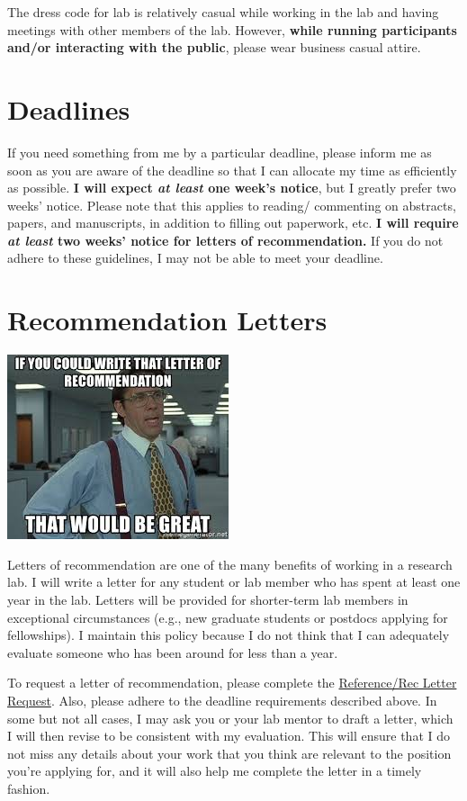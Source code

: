 \documentclass[]{book}
\begin{document}
The dress code for lab is relatively casual while working in the lab and having meetings with other members of the lab. However,
\textbf{while running participants and/or interacting with the public}, please wear business casual attire.

\hypertarget{deadlines}{%
\section{Deadlines}\label{deadlines}}

If you need something from me by a particular deadline, please inform me as soon as you are aware of the deadline so that I can allocate my time as efficiently as possible. \textbf{I will expect \emph{at least} one week's notice}, but I greatly prefer two weeks' notice. Please note that this applies to reading/ commenting on abstracts, papers, and manuscripts, in addition to filling out paperwork, etc. \textbf{I will require \emph{at least} two weeks' notice for letters of recommendation.} If you do not adhere to these guidelines, I may not be able to meet your deadline.

\hypertarget{recommendation-letters}{%
\section{Recommendation Letters}\label{recommendation-letters}}

\includegraphics{images/recletter.jpg}

Letters of recommendation are one of the many benefits of working in a research lab. I will write a letter for any student or lab member who has spent at least one year in the lab. Letters will be provided for shorter-term lab members in exceptional circumstances (e.g., new graduate students or postdocs applying for fellowships). I maintain this policy because I do not think that I can adequately evaluate someone who has been around for less than a year.

To request a letter of recommendation, please complete the \href{https://docs.google.com/forms/d/1F_NeLFXH7F3mjJD0l_cS1RFaUSOPS_IdfeT4KvJvLgU/edit}{Reference/Rec Letter Request}. Also, please adhere to the deadline requirements described above. In some but not all cases, I may ask you or your lab mentor to draft a letter, which I will then revise to be consistent with my evaluation. This will ensure that I do not miss any details about your work that you think are relevant to the position you're applying for, and it will also help me complete the letter in a timely fashion.
\end{document}
